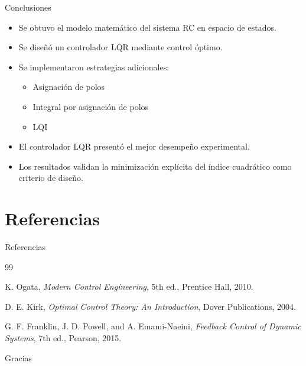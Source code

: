 \documentclass[aspectratio=169]{beamer}
\begin{document}
\begin{frame}{Conclusiones}

\begin{itemize}

\item Se obtuvo el modelo matemático del sistema RC en espacio de estados.
\vspace{0.3cm}

\item Se diseñó un controlador LQR mediante control óptimo.
\vspace{0.3cm}

\item Se implementaron estrategias adicionales:
\begin{itemize}
    \item Asignación de polos
    \item Integral por asignación de polos
    \item LQI
\end{itemize}

\vspace{0.3cm}

\item El controlador LQR presentó el mejor desempeño experimental.
\vspace{0.3cm}

\item Los resultados validan la minimización explícita del índice cuadrático como criterio de diseño.

\end{itemize}

\end{frame}

\section{Referencias}

\begin{frame}{Referencias}

\footnotesize

\begin{thebibliography}{99}

K. Ogata,
\textit{Modern Control Engineering},
5th ed.,
Prentice Hall,
2010.

\vspace{0.3cm}

D. E. Kirk,
\textit{Optimal Control Theory: An Introduction},
Dover Publications,
2004.

\vspace{0.3cm}

G. F. Franklin, J. D. Powell, and A. Emami-Naeini,
\textit{Feedback Control of Dynamic Systems},
7th ed.,
Pearson,
2015.

\end{thebibliography}

\end{frame}

\begin{frame}
\centering
\Huge
Gracias
\end{frame}

\end{document}
